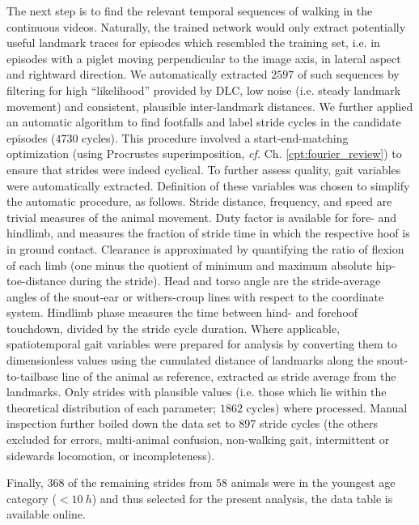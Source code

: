The next step is to find the relevant temporal sequences of walking in the continuous videos.
Naturally, the trained network would only extract potentially useful landmark traces for episodes which resembled the training set, i.e. in episodes with a piglet moving perpendicular to the image axis, in lateral aspect and rightward direction.
We automatically extracted \(2597\) of such sequences by filtering for high  ``likelihood'' provided by DLC, low noise (i.e. steady landmark movement) and consistent, plausible inter-landmark distances.
We further applied an automatic algorithm to find footfalls and label stride cycles in the candidate episodes (\(4730\) cycles).
This procedure involved a start-end-matching optimization (using Procrustes superimposition, \textit{cf.} Ch. \ref{cpt:fourier_review}) to ensure that strides were indeed cyclical.
To further assess  quality, gait variables were automatically extracted.
Definition of these variables was chosen to simplify the automatic procedure, as follows.
Stride distance, frequency, and speed are trivial measures of the animal movement.
Duty factor is available for fore- and hindlimb, and measures the fraction of stride time in which the respective hoof is in ground contact.
Clearance is approximated by quantifying the ratio of flexion of each limb (one minus the quotient of minimum and maximum absolute hip-toe-distance during the stride).
Head and torso angle are the stride-average angles of the snout-ear or withers-croup lines with respect to the coordinate system.
Hindlimb phase measures the time between hind- and forehoof touchdown, divided by the stride cycle duration.
Where applicable, spatiotemporal gait variables were prepared for analysis by converting them to dimensionless values \citep{Hof1996,Alexander1983} using the cumulated distance of landmarks along the snout-to-tailbase line of the animal as reference, extracted as stride average from the  landmarks.
Only strides with plausible values (i.e. those which lie within the theoretical distribution of each parameter; \(1862\) cycles) where processed.
Manual inspection further boiled down the data set to 897 stride cycles (the others excluded for  errors, multi-animal confusion, non-walking gait, intermittent or sidewards locomotion, or incompleteness).

Finally, \(368\) of the remaining strides from \(58\) animals were in the youngest age category (\(<10\ h\)) and thus selected for the present analysis, the data table is available online.



